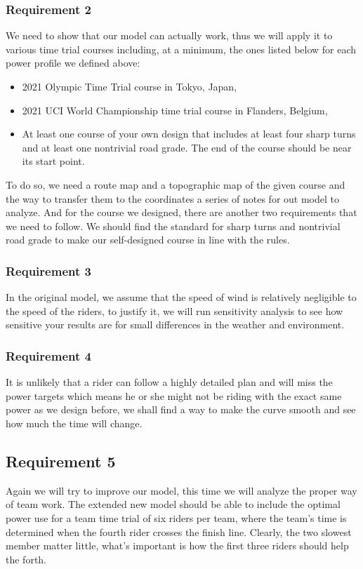 \documentclass[12pt]{article}
\begin{document}
\subsubsection{Requirement 2}
We need to show that our model can actually work, thus we will apply it to various time trial courses including, at a minimum, the ones listed
below for each power profile we defined above:
\begin{itemize}
    \item 2021 Olympic Time Trial course in Tokyo, Japan,
    \item 2021 UCI World Championship time trial course in Flanders, Belgium,
    \item At least one course of your own design that includes at least four sharp turns and
          at least one nontrivial road grade. The end of the course should be near its start
          point.
\end{itemize}
To do so, we need a route map and a topographic map of the given course and the way to transfer them to the coordinates a series of notes for out model to analyze.
And for the course we designed, there are another two requirements that we need to follow.
We should find the standard for sharp turns and nontrivial road grade to make our self-designed course in line with the rules.
\subsubsection{Requirement 3}
In the original model, we assume that the speed of wind is relatively negligible %
to the speed of the riders, to justify it, we will run sensitivity analysis to see how sensitive your results are for small differences in the weather
and environment.
\subsubsection{Requirement 4}
It is unlikely that a rider can follow a highly detailed plan and will miss the power targets which means he or she might not be riding with the exact same power as
we design before, we shall find a way to make the curve smooth and see how much the time will change. %
\subsection{Requirement 5}
Again we will try to improve our model, this time we will analyze the proper way of team work. The extended new model should be able to  include the optimal power use for a team time trial of six riders per team, where the team's time is
determined when the fourth rider crosses the finish line. Clearly, the two slowest member matter little, what's important is how the first three riders should help the forth.
\end{document}
